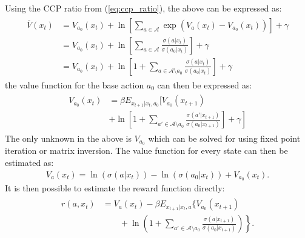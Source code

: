 \documentclass{article}
\begin{document}
Using the CCP ratio from (\ref{eq:ccp_ratio}), the above can be expressed as:
\begin{align} 
\begin{split}
\overline{V}(x_t) &=V_{a_0}(x_t)+\ln\left[\sum_{a\in\mathcal{A}} \exp(V_a(x_t)-V_{a_0}(x_t))\right]+\gamma\\
&=V_{a_0}(x_t)+\ln\left[\sum_{a\in\mathcal{A}} \frac{\sigma(a|x_t)}{\sigma(a_0|x_t)}\right]+\gamma\\
&=V_{a_0}(x_t)+\ln\left[1+\sum_{a\in\mathcal{A}\setminus a_0} \frac{\sigma(a|x_t)}{\sigma(a_0|x_t)}\right]+\gamma
\end{split}
\end{align}
the value function for the base action $a_0$ can then be expressed as:
\begin{align}
\begin{split}
V_{a_0}(x_t)&=
 \beta E_{x_{t+1}|x_t,a_0}
\Bigg[V_{a_0}(x_{t+1}) \\
&\left. +\ln\left[1+ \sum_{a'\in\mathcal{A}\setminus a_0}\frac{\sigma(a'|x_{t+1})}{\sigma(a_0|x_{t+1})}\right]+\gamma\right]
\end{split}
\end{align}
The only unknown in the above is $V_{a_0}$ which can be solved for using fixed point iteration or matrix inversion. The value function for every state can then be estimated as:
\begin{eqnarray}
V_a(x_t)=\ln(\sigma(a|x_t))-\ln(\sigma(a_0|x_t))+V_{a_0}(x_t).\label{eq:v_backout}
\end{eqnarray}
It is then possible to estimate the reward function directly:
\begin{align}
\begin{split}
r(a,x_t)
&=V_a(x_t)- \beta E_{x_{t+1}|x_t,a}\Bigg\{
V_{a_0}(x_{t+1})
\\ &\left.\qquad +
\ln
  \left(
    1 + \sum_{a'\in\mathcal{A}\setminus a_0}\frac{\sigma(a|x_{t+1})}{\sigma(a_0|x_{t+1})}
  \right)
\right\}.
\end{split}
\end{align}

\end{document}
